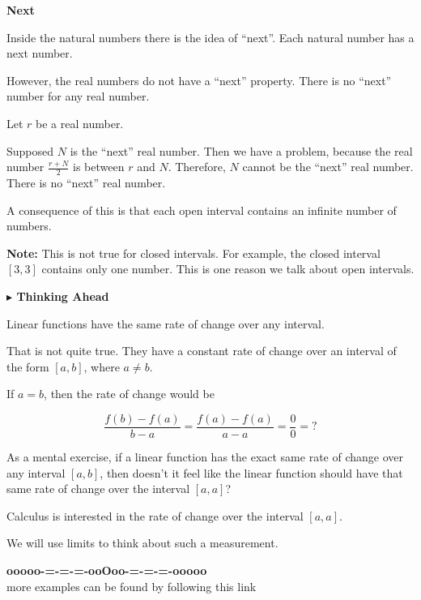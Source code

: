 \documentclass{ximera}
\begin{document}
\begin{idea} \textbf{\textcolor{blue!55!black}{Next}}



Inside the natural numbers there is the idea of ``next''.  Each natural number has a next number. 


However, the real numbers do not have a ``next'' property.  There is no ``next'' number for any real number.


Let $r$ be a real number. 

Supposed $N$ is the ``next'' real number.  Then we have a problem, because the real number $\frac{r+N}{2}$ is between $r$ and $N$.  Therefore, $N$ cannot be the ``next'' real number.  There is no ``next'' real number. 


A consequence of this is that each open interval contains an infinite number of numbers. 



\textbf{Note: } This is not true for closed intervals.  For example, the closed interval $[3, 3]$ contains only one number.  This is one reason we talk about open intervals.



\end{idea}





\textbf{\textcolor{red!70!black}{$\blacktriangleright$ Thinking Ahead}} 


Linear functions have the same rate of change over any interval. 

That is not quite true.  They have a constant rate of change over an interval of the form $[a, b]$, where $a \ne b$. 


If $ a = b$, then the rate of change would be 

\[
\frac{f(b)-f(a)}{b-a} = \frac{f(a)-f(a)}{a-a} = \frac{0}{0} = ?
\]

As a mental exercise, if a linear function has the exact same rate of change over any interval $[a, b]$, then doesn't it feel like the linear function should have that same rate of change over the interval $[a, a]$? 



Calculus is interested in the rate of change over the interval $[a,a]$.

We will use limits to think about such a measurement.







\begin{onlineOnly}
\begin{center}
\textbf{\textcolor{green!50!black}{ooooo-=-=-=-ooOoo-=-=-=-ooooo}} \\

more examples can be found by following this link\\ 

\end{center}
\end{onlineOnly}
\end{document}
